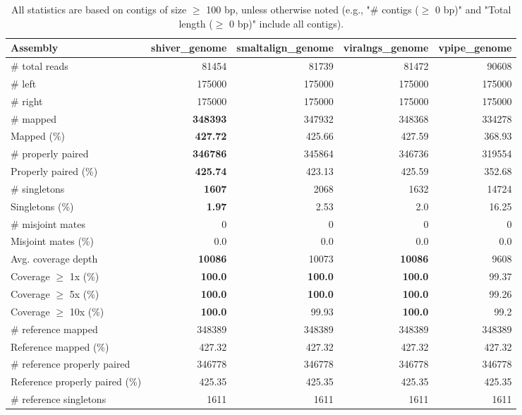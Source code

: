 \documentclass[12pt,a4paper]{article}
\begin{document}
\begin{table}[ht]
\begin{center}
\caption{All statistics are based on contigs of size $\geq$ 100 bp, unless otherwise noted (e.g., "\# contigs ($\geq$ 0 bp)" and "Total length ($\geq$ 0 bp)" include all contigs).}
\begin{tabular}{|l*{4}{|r}|}
\hline
Assembly & shiver\_genome & smaltalign\_genome & viralngs\_genome & vpipe\_genome \\ \hline
\# total reads & 81454 & 81739 & 81472 & 90608 \\ \hline
\# left & 175000 & 175000 & 175000 & 175000 \\ \hline
\# right & 175000 & 175000 & 175000 & 175000 \\ \hline
\# mapped & {\bf 348393} & 347932 & 348368 & 334278 \\ \hline
Mapped (\%) & {\bf 427.72} & 425.66 & 427.59 & 368.93 \\ \hline
\# properly paired & {\bf 346786} & 345864 & 346736 & 319554 \\ \hline
Properly paired (\%) & {\bf 425.74} & 423.13 & 425.59 & 352.68 \\ \hline
\# singletons & {\bf 1607} & 2068 & 1632 & 14724 \\ \hline
Singletons (\%) & {\bf 1.97} & 2.53 & 2.0 & 16.25 \\ \hline
\# misjoint mates & 0 & 0 & 0 & 0 \\ \hline
Misjoint mates (\%) & 0.0 & 0.0 & 0.0 & 0.0 \\ \hline
Avg. coverage depth & {\bf 10086} & 10073 & {\bf 10086} & 9608 \\ \hline
Coverage $\geq$ 1x (\%) & {\bf 100.0} & {\bf 100.0} & {\bf 100.0} & 99.37 \\ \hline
Coverage $\geq$ 5x (\%) & {\bf 100.0} & {\bf 100.0} & {\bf 100.0} & 99.26 \\ \hline
Coverage $\geq$ 10x (\%) & {\bf 100.0} & 99.93 & {\bf 100.0} & 99.2 \\ \hline
\# reference mapped & 348389 & 348389 & 348389 & 348389 \\ \hline
Reference mapped (\%) & 427.32 & 427.32 & 427.32 & 427.32 \\ \hline
\# reference properly paired & 346778 & 346778 & 346778 & 346778 \\ \hline
Reference properly paired (\%) & 425.35 & 425.35 & 425.35 & 425.35 \\ \hline
\# reference singletons & 1611 & 1611 & 1611 & 1611 \\ \hline

\end{tabular}
\end{center}
\end{table}
\end{document}
